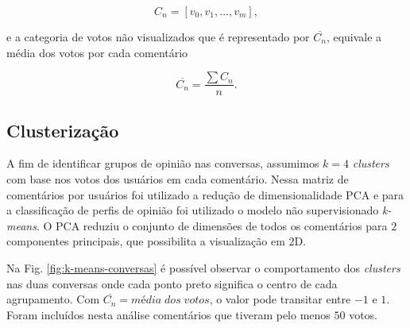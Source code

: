 

\begin{equation}
{C_{n}} = [v_0, v_1, \dots, v_m], 
\end{equation}

\noindent
e a categoria de votos não visualizados que é representado por $\overline{C_{n}}$, equivale a média dos votos por cada comentário

\begin{equation}
\overline{C_{n}} =  \frac{\sum C_{n}}{n}.
\end{equation}



\subsection{Clusterização}

A fim de identificar grupos de opinião nas conversas, assumimos $k=4$ \textit{clusters} com base nos votos dos usuários em cada comentário. Nessa matriz de comentários por usuários foi utilizado a redução de dimensionalidade PCA e para a classificação de perfis de opinião foi utilizado o modelo não supervisionado \textit{k-means}. O PCA reduziu o conjunto de dimensões de todos os comentários para $2$ componentes principais, que possibilita a visualização em 2D. 



Na Fig. \ref{fig:k-means-conversas} é possível observar o comportamento dos \textit{clusters} nas duas conversas onde cada ponto preto significa o centro de cada agrupamento. Com $\overline{C_{n}} = média\;dos\;votos$, o valor pode transitar entre $-1$ e $1$. Foram incluídos nesta análise comentários que tiveram pelo menos $50$ votos.

